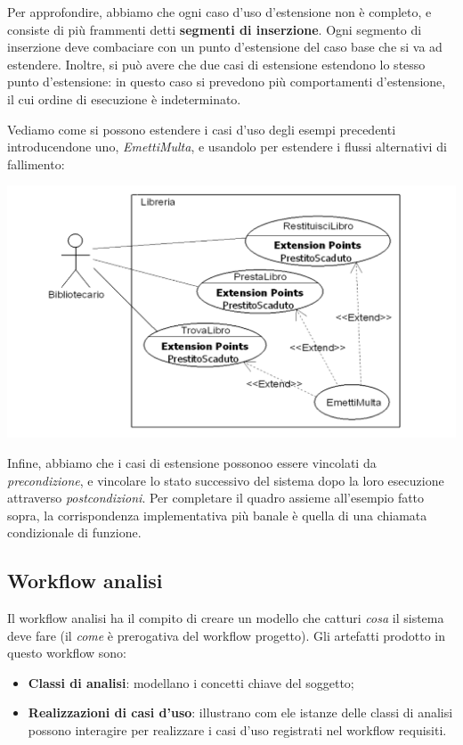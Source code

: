 \documentclass[a4paper,11pt]{article}
\begin{document}
\begin{itemize}
		Per approfondire, abbiamo che ogni caso d'uso d'estensione non è completo, e consiste di più frammenti detti \textbf{segmenti di inserzione}. Ogni segmento di inserzione deve combaciare con un punto d'estensione del caso base che si va ad estendere. Inoltre, si può avere che due casi di estensione estendono lo stesso punto d'estensione: in questo caso si prevedono più comportamenti d'estensione, il cui ordine di esecuzione è indeterminato.

\newpage

		Vediamo come si possono estendere i casi d'uso degli esempi precedenti introducendone uno, \textit{EmettiMulta}, e usandolo per estendere i flussi alternativi di fallimento:
\begin{center}
	\includegraphics[scale=0.35]{../figures/extend_casi_uso.png}
\end{center}

		Infine, abbiamo che i casi di estensione possonoo essere vincolati da \textit{precondizione}, e vincolare lo stato successivo del sistema dopo la loro esecuzione attraverso \textit{postcondizioni}. Per completare il quadro assieme all'esempio fatto sopra, la corrispondenza implementativa più banale è quella di una chiamata condizionale di funzione.
\end{itemize}

\subsection{Workflow analisi}
Il workflow analisi ha il compito di creare un modello che catturi \textit{cosa} il sistema deve fare (il \textit{come} è prerogativa del workflow progetto).
Gli artefatti prodotto in questo workflow sono:
\begin{itemize}
	\item \textbf{Classi di analisi}: modellano i concetti chiave del soggetto;
	\item \textbf{Realizzazioni di casi d'uso}: illustrano com ele istanze delle classi di analisi possono interagire per realizzare i casi d'uso registrati nel workflow requisiti.
\end{itemize}
\end{document}
